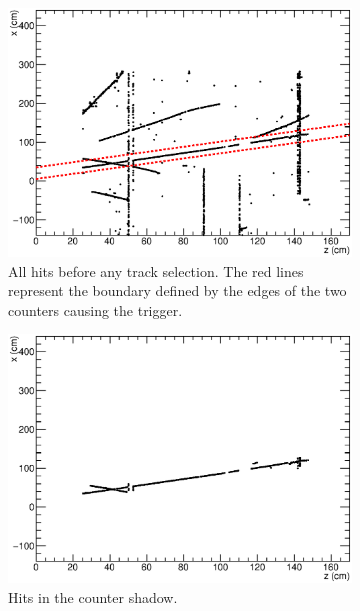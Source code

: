 \begin{figure}[ht]
  \centering
  \begin{subfigure}[t]{0.48\linewidth}
    \centering
    \includegraphics[width=\textwidth]{hitselection_all.eps}
    \caption{All hits before any track selection.  The red lines represent the boundary defined by the edges of the two counters causing the trigger.}
    \label{fig:TrackSelectionBefore}
  \end{subfigure}
  \hfill
  \begin{subfigure}[t]{0.48\linewidth}
    \centering
    \includegraphics[width=\textwidth]{hitselection_shadow.eps}
    \caption{Hits in the counter shadow.}
    \label{fig:TrackSelectionCounterShadow}
  \end{subfigure}
  \hfill
  \begin{subfigure}[t]{0.48\linewidth}

\end{subfigure}
\end{figure}
